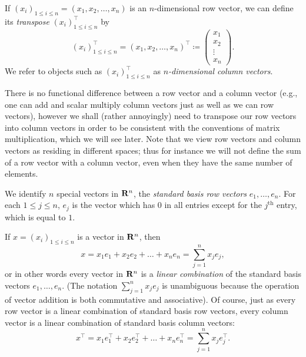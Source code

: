 \begin{definition}[Transpose]\label{6.1.3}
  If \((x_i)_{1 \leq i \leq n} = (x_1, x_2, \dots, x_n)\) is an \(n\)-dimensional row vector, we can define its \emph{transpose} \((x_i)_{1 \leq i \leq n}^\top\) by
  \[
    (x_i)_{1 \leq i \leq n}^\top = (x_1, x_2, \dots, x_n)^\top \coloneqq \begin{pmatrix}
      x_1    \\
      x_2    \\
      \vdots \\
      x_n
    \end{pmatrix}.
  \]
  We refer to objects such as \((x_i)_{1 \leq i \leq n}^\top\) as \emph{\(n\)-dimensional column vectors}.
\end{definition}

\begin{remark}\label{6.1.4}
  There is no functional difference between a row vector and a column vector (e.g., one can add and scalar multiply column vectors just as well as we can row vectors), however we shall (rather annoyingly) need to transpose our row vectors into column vectors in order to be consistent with the conventions of matrix multiplication, which we will see later.
  Note that we view row vectors and column vectors as residing in different spaces;
  thus for instance we will not define the sum of a row vector with a column vector, even when they have the same number of elements.
\end{remark}

\begin{definition}\label{6.1.5}
  We identify \(n\) special vectors in \(\mathbf{R}^n\), the \emph{standard basis row vectors} \(e_1, \dots, e_n\).
  For each \(1 \leq j \leq n\), \(e_j\) is the vector which has \(0\) in all entries except for the \(j^{\text{th}}\) entry, which is equal to \(1\).
\end{definition}

\begin{note}
  If \(x = (x_i)_{1 \leq i \leq n}\) is a vector in \(\mathbf{R}^n\), then
  \[
    x = x_1 e_1 + x_2 e_2 + \dots + x_n e_n = \sum_{j = 1}^n x_j e_j,
  \]
  or in other words every vector in \(\mathbf{R}^n\) is a \emph{linear combination} of the standard basis vectors \(e_1, \dots, e_n\).
  (The notation \(\sum_{j = 1}^n x_j e_j\) is unambiguous because the operation of vector addition is both commutative and associative).
  Of course, just as every row vector is a linear combination of standard basis row vectors, every column vector is a linear combination of standard basis column vectors:
  \[
    x^\top = x_1 e_1^\top + x_2 e_2^\top + \dots + x_n e_n^\top = \sum_{j = 1}^n x_j e_j^\top.
  \]
\end{note}

